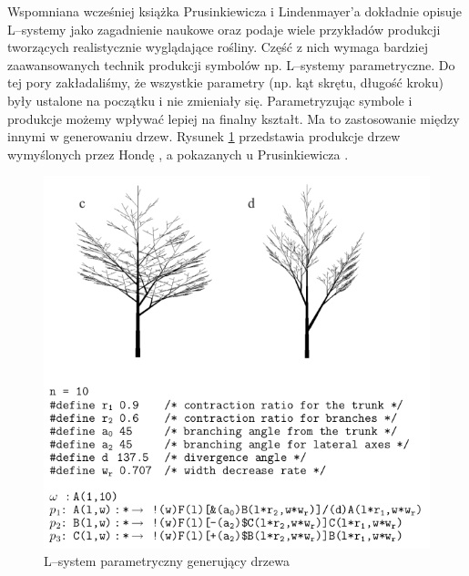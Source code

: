 \documentclass[inz,longabstract]{iithesis}
\begin{document}
        Wspomniana wcześniej książka Prusinkiewicza i Lindenmayer'a \cite{plants} dokładnie opisuje L--systemy jako zagadnienie naukowe oraz podaje wiele przykładów produkcji tworzących realistycznie wyglądające rośliny. Część z nich wymaga bardziej zaawansowanych technik produkcji symbolów np. L--systemy parametryczne. Do tej pory zakładaliśmy, że wszystkie parametry (np. kąt skrętu, długość kroku) były ustalone na początku i nie zmieniały się. Parametryzując symbole i produkcje możemy wpływać lepiej na finalny kształt. Ma to zastosowanie między innymi w generowaniu drzew. Rysunek \ref{fig:hondaTrees} przedstawia produkcje drzew wymyślonych przez Hondę \cite{honda}, a pokazanych u Prusinkiewicza \cite{plants}.
        \begin{figure}[H]
            \includegraphics[width=\linewidth]{hondaTrees.png}
            \caption{L--system parametryczny generujący drzewa \cite{plants}\cite{honda}} 
            \label{fig:hondaTrees}
        \end{figure}
        
\end{document}
